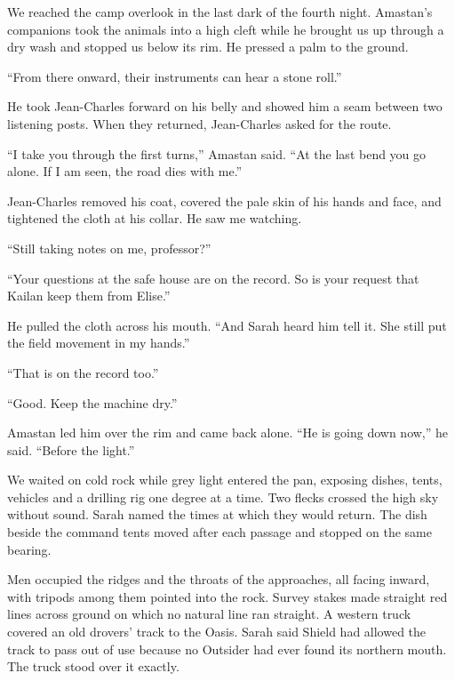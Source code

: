 \ornament

We reached the camp overlook in the last dark of the fourth night. Amastan's companions took the animals into a high cleft while he brought us up through a dry wash and stopped us below its rim. He pressed a palm to the ground.\par

``From there onward, their instruments can hear a stone roll.''\par

He took Jean-Charles forward on his belly and showed him a seam between two listening posts. When they returned, Jean-Charles asked for the route.\par

``I take you through the first turns,'' Amastan said. ``At the last bend you go alone. If I am seen, the road dies with me.''\par

Jean-Charles removed his coat, covered the pale skin of his hands and face, and tightened the cloth at his collar. He saw me watching.\par

``Still taking notes on me, professor?''\par

``Your questions at the safe house are on the record. So is your request that Kailan keep them from Elise.''\par

He pulled the cloth across his mouth. ``And Sarah heard him tell it. She still put the field movement in my hands.''\par

``That is on the record too.''\par

``Good. Keep the machine dry.''\par

Amastan led him over the rim and came back alone. ``He is going down now,'' he said. ``Before the light.''\par

We waited on cold rock while grey light entered the pan, exposing dishes, tents, vehicles and a drilling rig one degree at a time. Two flecks crossed the high sky without sound. Sarah named the times at which they would return. The dish beside the command tents moved after each passage and stopped on the same bearing.\par

Men occupied the ridges and the throats of the approaches, all facing inward, with tripods among them pointed into the rock. Survey stakes made straight red lines across ground on which no natural line ran straight. A western truck covered an old drovers' track to the Oasis. Sarah said Shield had allowed the track to pass out of use because no Outsider had ever found its northern mouth. The truck stood over it exactly.\par

